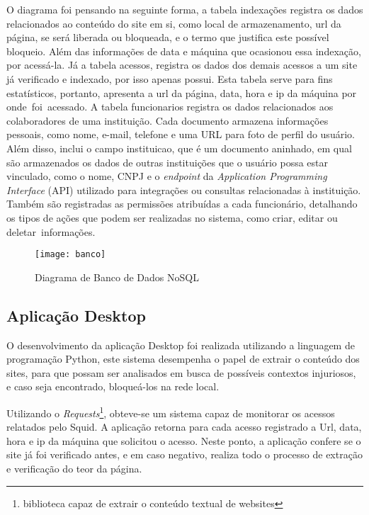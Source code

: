 O diagrama foi pensando na seguinte forma, a tabela indexações registra os dados relacionados ao conteúdo do site em si, como local de armazenamento, url da página, se será liberada ou bloqueada, e o termo que justifica este possível bloqueio. Além das informações de data e máquina que ocasionou essa indexação, por acessá-la.
Já a tabela acessos, registra os dados dos demais acessos a um site já verificado e indexado, por isso apenas possui. Esta tabela serve para fins estatísticos, portanto, apresenta a url da página, data, hora e ip da máquina por onde foi acessado.
A tabela funcionarios registra os dados relacionados aos colaboradores de uma instituição. Cada documento armazena informações pessoais, como nome, e-mail, telefone e uma URL para foto de perfil do usuário. Além disso, inclui o campo instituicao, que é um documento aninhado, em qual são armazenados os dados de outras instituições que o usuário possa estar vinculado, como o nome, CNPJ e o \textit{endpoint} da \textit{Application Programming Interface} (API) utilizado para integrações ou consultas relacionadas à instituição. Também são registradas as permissões atribuídas a cada funcionário, detalhando os tipos de ações que podem ser realizadas no sistema, como criar, editar ou deletar informações.

\begin{figure}[H]
    \centering
    \caption{Diagrama de Banco de Dados NoSQL}%
    \label{fig:banco}
    \texttt{[image: banco]}
    \end{figure}

\subsection*{Aplicação Desktop}

O desenvolvimento da aplicação Desktop foi realizada utilizando a linguagem de programação Python, este sistema desempenha o papel de extrair o conteúdo dos sites, para que possam ser analisados em busca de possíveis contextos injuriosos, e caso seja encontrado, bloqueá-los na rede local.

Utilizando o \textit{Requests}\footnote{biblioteca capaz de extrair o conteúdo textual de websites}, obteve-se um sistema capaz de monitorar os acessos relatados pelo Squid. A aplicação retorna para cada acesso registrado a Url, data, hora e ip da máquina que solicitou o acesso. Neste ponto, a aplicação confere se o site já foi verificado antes, e em caso negativo, realiza todo o processo de extração e verificação do teor da página.

